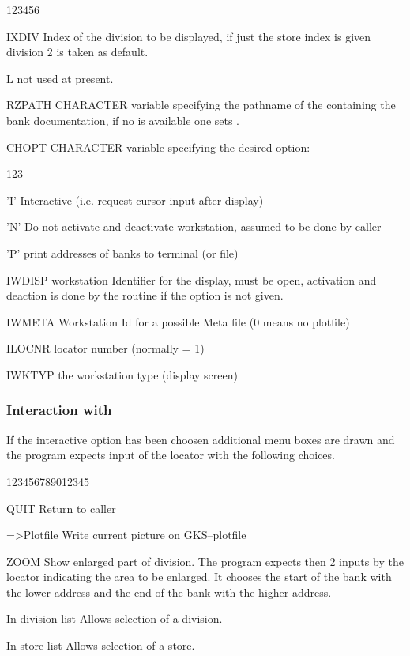  
 
\Idesc
 
\begin{DLtt}{123456}
\item[IXDIV]  Index of the division to be displayed, if just the store index
              is given division 2 is taken as default.
\item[L]      not used at present.
\item[RZPATH] CHARACTER variable specifying the pathname of the \RZfile{} containing
              the bank documentation, if no \RZfile{} is available one sets 
              .
\item[CHOPT]  CHARACTER variable specifying the desired option:
  \begin{DLtt}{123}
     \item['I']  Interactive (i.e. request cursor input after display)
     \item['N']  Do not activate and deactivate workstation, assumed to be done
                 by caller
     \item['P']  print addresses of banks to terminal (or file)
  \end{DLtt}
\item[IWDISP] workstation Identifier for the display, 
               must be open, activation and deaction is done by the routine
              if the  option is not given.
\item[IWMETA] Workstation Id for a possible Meta file (0 means no plotfile)
\item[ILOCNR] locator number (normally = 1)
\item[IWKTYP] the workstation type (display screen)
\end{DLtt}
 
\subsubsection*{Interaction with }
 
If the interactive option has been choosen additional menu
boxes are drawn and the program expects input
of the locator with the following choices.
 
\begin{DLtt}{123456789012345}
\item[QUIT]       Return to caller
\item[=>Plotfile] Write current picture on GKS--plotfile
\item[ZOOM]       Show enlarged part of division.
                  The program expects then 2 inputs by the locator
                  indicating the area to be enlarged. 
                  It chooses the start of the bank with the lower address and the end
                  of the bank with the higher address.
\item[In division list] Allows selection of a division.
\item[In store list]    Allows selection of a store.
\end{DLtt}
 
